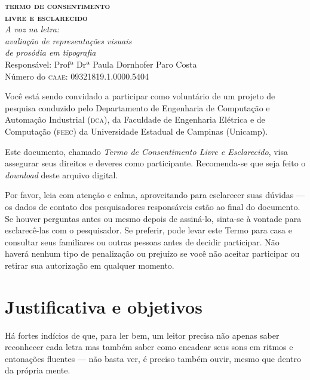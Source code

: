 \documentclass[a4paper,11pt,titlepage,singlespacing]{article}
\begin{document}
	\begin{center}
		\textbf{\Large{\textsc{termo de consentimento \\ livre e esclarecido}}}\\
        \vspace{5pt}
        {\Large\textit{A voz na letra: \\ avaliação de representações visuais \\ de prosódia em tipografia \\ }}
        \vspace{10pt}
        Responsável: Profª Drª Paula Dornhofer Paro Costa\\
        Número do \textsc{caae}: 09321819.1.0000.5404 \\
        \vspace{15pt}
	\end{center}

\noindent Você está sendo convidado a participar como voluntário de um projeto de pesquisa conduzido pelo Departamento de Engenharia de Computação e Automação Industrial (\textsc{dca}), da Faculdade de Engenharia Elétrica e de Computação (\textsc{feec}) da Universidade Estadual de Campinas (Unicamp).

Este documento, chamado \textit{Termo de Consentimento Livre e Esclarecido}, visa assegurar seus direitos e deveres como participante. Recomenda-se que seja feito o \textit{download} deste arquivo digital.

Por favor, leia com atenção e calma, aproveitando para esclarecer suas dúvidas — os dados de contato dos pesquisadores responsáveis estão ao final do documento. Se houver perguntas antes ou mesmo depois de assiná-lo, sinta-se à vontade para esclarecê-las com o pesquisador. Se preferir, pode levar este Termo para casa e consultar seus familiares ou outras pessoas antes de decidir participar. Não haverá nenhum tipo de penalização ou prejuízo se você não aceitar participar ou retirar sua autorização em qualquer momento.


\section*{Justificativa e objetivos}

\noindent Há fortes indícios de que, para ler bem, um leitor precisa não apenas saber reconhecer cada letra mas também saber como encadear seus sons em ritmos e entonações fluentes — não basta ver, é preciso também ouvir, mesmo que dentro da própria mente. 
\end{document}
